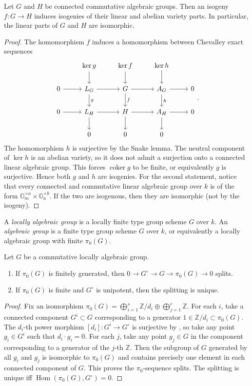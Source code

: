 \documentclass[reqno, letterpaper]{amsart}
\numberwithin{equation}{subsection}
\let\to\longrightarrow
\newcommand{\GG}{\mathbb{G}}
\newcommand{\ZZ}{\mathbb{Z}}
\DeclareMathOperator{\Hom}{Hom}
\DeclareMathOperator{\coker}{coker}
\begin{document}
		\begin{lemma} \label{lem:isogeny}
			Let $G$ and $H$ be connected commutative algebraic groups. Then an isogeny $f : G \to H$ induces isogenies of their linear and abelian variety parts. In particular, the linear parts of $G$ and $H$ are isomorphic.
		\end{lemma}
		\begin{proof}
			The homomorphism $f$ induces a homomorphism between Chevalley exact sequences
			\[\begin{tikzcd}
				& \ker g \arrow[d] & \ker f \arrow[d] & \ker h \arrow[d] \\
				0 \arrow[r] & L_G \arrow[r] \arrow[d, "g"] & G \arrow[r] \arrow[d, "f"] & A_G \arrow[r] \arrow[d, "h"] & 0 \\
				0 \arrow[r] & L_H \arrow[r] \arrow[d] & H \arrow[r] \arrow[d] & A_H \arrow[r] \arrow[d] & 0 \\
				& 0 & 0 & 0
			\end{tikzcd}.\]
			The homomorphism $h$ is surjective by the Snake lemma. The neutral component of $\ker h$ is an abelian variety, so it does not admit a surjection onto a connected linear algebraic group. This forces $\coker g$ to be finite, or equivalently $g$ is surjective. Hence both $g$ and $h$ are isogenies. For the second statement, notice that every connected and commutative linear algebraic group over $k$ is of the form $\GG_m^{\times a} \times \GG_a^{\times b}$. If the two are isogenous, then they are isomorphic (not by the isogeny).
		\end{proof}
		
		A \emph{locally algebraic group} is a locally finite type group scheme $G$ over $k$. An \emph{algebraic group} is a finite type group scheme $G$ over $k$, or equivalently a locally algebraic group with finite $\pi_0(G)$.
		
		\begin{lemma} \label{lem:pi_0 sequence splits}
			Let $G$ be a commutative locally algebraic group.
			\begin{enumerate}
				\item If $\pi_0(G)$ is finitely generated, then $0 \to G^{\circ} \to G \to \pi_0(G) \to 0$ splits.
				\item If $\pi_0(G)$ is finite and $G^{\circ}$ is unipotent, then the splitting is unique.
			\end{enumerate}
		\end{lemma}
		\begin{proof}
			Fix an isomorphism $\pi_0(G) = \bigoplus_{i=1}^s \ZZ/d_i \oplus \bigoplus_{j=1}^r \ZZ$. For each $i$, take a connected component $G^i \subset G$ corresponding to a generator $1 \in \ZZ/d_i \subset \pi_0(G)$. The $d_i$-th power morphism $[d_i] : G^i \to G^{\circ}$ is surjective by \cite[Lemma~7.3.1]{neron}, so take any point $g_i \in G^i$ such that $d_i \cdot g_i = 0$. For each $j$, take any point $g_j \in G$ in the component corresponding to a generator of the $j$-th $\ZZ$. Then the subgroup of $G$ generated by all $g_i$ and $g_j$ is isomorphic to $\pi_0(G)$ and contains precisely one element in each connected component of $G$. This proves the $\pi_0$-sequence splits. The splitting is unique iff $\Hom(\pi_0(G), G^{\circ}) = 0$.
		\end{proof}
		
\end{document}
